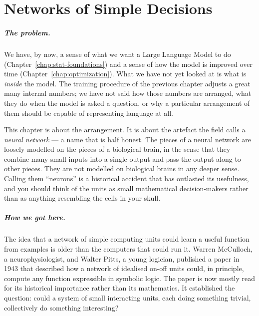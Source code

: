 
\chapter{Networks of Simple Decisions}
\label{chap:neural-networks}
\label{ntg:ch3}

\scenelabel
\begin{scenestrip}
\end{scenestrip}

\paragraph{The problem.} We have, by now, a sense of what we want a Large Language Model
to do (Chapter~\ref{chap:stat-foundations}) and a sense of how the model is improved over
time (Chapter~\ref{chap:optimization}). What we have not yet looked at is what is
\emph{inside} the model. The training procedure of the previous
chapter adjusts a great many internal numbers; we have not said
how those numbers are arranged, what they do when the model is
asked a question, or why a particular arrangement of them
should be capable of representing language at all.

This chapter is about the arrangement. It is about the artefact
the field calls a \emph{neural network} --- a name that is half
honest. The pieces of a neural network are loosely modelled on
the pieces of a biological brain, in the sense that they
combine many small inputs into a single output and pass the
output along to other pieces. They are not modelled on biological
brains in any deeper sense. Calling them ``neurons'' is a
historical accident that has outlasted its usefulness, and you
should think of the units as small mathematical decision-makers
rather than as anything resembling the cells in your skull.

\paragraph{How we got here.} The idea that a network of simple computing units could learn a
useful function from examples is older than the computers that
could run it. Warren McCulloch, a neurophysiologist, and Walter
Pitts, a young logician, published a paper in 1943 that
described how a network of idealised on-off units could, in
principle, compute any function expressible in symbolic logic.
The paper is now mostly read for its historical importance
rather than its mathematics. It established the question:
could a system of small interacting units, each doing something
trivial, collectively do something interesting?

